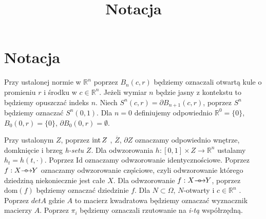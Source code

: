 \title{Notacja}

\section{Notacja}
Przy ustalonej normie w $ \mathbb{R}^n $ poprzez $B_n(c,r)$ będziemy 
oznaczali otwartą kule o promieniu $r$ i środku w $ c \in \mathbb{R}^n $.
Jeżeli wymiar $n$ będzie jasny z kontekstu to będziemy opuszczać indeks $n$.
Niech  $S^n(c,r)=\partial B_{n+1}(c,r)$, poprzez $S^n$ będziemy oznaczać $S^n(0,1)$.
Dla $n=0$ definiujemy odpowiednio $\mathbb{R}^0=\{0\}$, $B_0(0,r)=\{0\}$, $\partial B_0(0,r)=\emptyset$.


Przy ustalonym $Z$, poprzez ${\rm int}\, Z$ , $\overline{Z}$, $\partial Z$ 
oznaczamy odpowiednio wnętrze, domknięcie i brzeg {\em h-setu} $Z$.
Dla odwzorowania $h:[0,1]\times Z \to \mathbb{R}^n$ ustalamy  $h_t=h(t,\cdot)$.
Poprzez $\mbox{Id}$ oznaczamy odwzorowanie identycznościowe. 
Poprzez $f:X{\mathrel{\longrightarrow\mkern-25mu\circ}\;\;} Y$ oznaczamy odwzorowanie częściowe, czyli 
odwzorowanie którego dziedziną niekoniecznie jest całe $X$. 
Dla odwzorowanie $f:X{\mathrel{\longrightarrow\mkern-25mu\circ}\;\;} Y$, poprzez $\mbox{dom}(f)$ będziemy
oznaczać dziedzinie $f$. Dla $N \subset \Omega$, $N$-otwarty i $ c \in 
\mathbb{R}^n$ . Poprzez $ det A $ gdzie $ A $ to macierz kwadratowa będziemy 
oznaczać wyznacznik macierzy $ A $.
Poprzez $ \pi_i $ będziemy oznaczali rzutowanie na {\em i-tą } współrzędną.